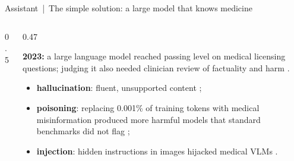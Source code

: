 \documentclass[aspectratio=169,10pt]{beamer}
\begin{document}
\begin{frame}{Assistant \,|\, The simple solution: a large model that knows medicine}
\begin{columns}[T]
\begin{column}{0.5\textwidth}
\begin{sfig}[0.62]
\end{sfig}
\end{column}
\begin{column}{0.47\textwidth}
{\footnotesize\textbf{2023:} a large language model reached passing level on medical licensing questions; judging it also needed clinician review of factuality and harm .

\vspace{2mm}
\begin{itemize}\setlength\itemsep{1pt}
\item \textbf{hallucination}: fluent, unsupported content ;
\item \textbf{poisoning}: replacing 0.001\% of training tokens with medical misinformation produced more harmful models that standard benchmarks did not flag ;
\item \textbf{injection}: hidden instructions in images hijacked medical VLMs .
\end{itemize}}
\end{column}
\end{columns}
\end{frame}
\end{document}
